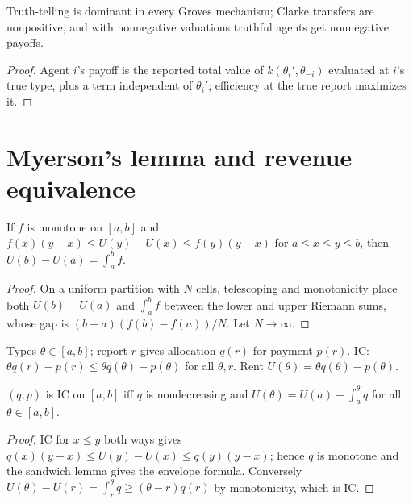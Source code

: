 \begin{theorem}
\label{thm:groves}
\leanok
{}
Truth-telling is dominant in every Groves mechanism; Clarke transfers are nonpositive, and with
nonnegative valuations truthful agents get nonnegative payoffs.
\end{theorem}
\begin{proof}
\leanok
Agent $i$'s payoff is the reported total value of $k(\theta_i', \theta_{-i})$ evaluated at $i$'s true type,
plus a term independent of $\theta_i'$; efficiency at the true report maximizes it.
\end{proof}

\section{Myerson's lemma and revenue equivalence}
\label{sec:myerson}

\begin{lemma}
\label{lem:sandwich}
\leanok
If $f$ is monotone on $[a,b]$ and $f(x)(y-x) \le U(y) - U(x) \le f(y)(y-x)$ for $a \le x \le y \le b$, then
$U(b) - U(a) = \int_a^b f$.
\end{lemma}
\begin{proof}
\leanok
On a uniform partition with $N$ cells, telescoping and monotonicity place both $U(b)-U(a)$ and $\int_a^b f$ between the
lower and upper Riemann sums, whose gap is $(b-a)(f(b)-f(a))/N$. Let $N\to\infty$.
\end{proof}

\begin{definition}
\label{def:ic-mech}
\leanok
Types $\theta \in [a,b]$; report $r$ gives allocation $q(r)$ for payment $p(r)$. IC: $\theta q(r) - p(r) \le
\theta q(\theta) - p(\theta)$ for all $\theta, r$. Rent $U(\theta) = \theta q(\theta) - p(\theta)$.
\end{definition}

\begin{theorem}
\label{thm:myerson-lemma}
\leanok
{}
$(q,p)$ is IC on $[a,b]$ iff $q$ is nondecreasing and $U(\theta) = U(a) + \int_a^\theta q$ for all $\theta \in [a,b]$.
\end{theorem}
\begin{proof}
\leanok
IC for $x \le y$ both ways gives $q(x)(y-x) \le U(y) - U(x) \le q(y)(y-x)$; hence $q$ is monotone and the sandwich
lemma gives the envelope formula. Conversely $U(\theta) - U(r) = \int_r^\theta q \ge (\theta - r) q(r)$ by monotonicity,
which is IC.
\end{proof}

